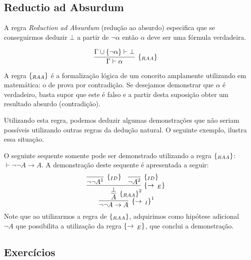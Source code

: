 \subsection{Reductio ad Absurdum}

A regra \emph{Reduction ad Absurdum} (redução ao absurdo) especifica
que se conseguirmos deduzir $\bot$ a partir de $\neg \alpha$ então $\alpha$ deve
ser uma fórmula verdadeira.

\[
    \infer[\raa]{\Gamma \vdash \alpha}
                     {\Gamma\cup\{\neg \alpha\}\vdash \bot}
\]

A regra $\scriptsize{\{_{RAA}\}}$ é a formalização lógica de um conceito amplamente
utilizando em matemática: o de prova por contradição. Se desejamos
demonstrar que $\alpha$ é verdadeiro, basta supor que este é falso e a
partir desta suposição obter um resultado absurdo (contradição).

Utilizando esta regra, podemos deduzir algumas demonstrações que não
seriam possíveis utilizando outras regras da dedução natural. O
seguinte exemplo, ilustra essa situação.

\begin{Example}
O seguinte sequente somente pode ser demonstrado utilizando a regra
$\scriptsize{\{_{RAA}\}}$: $\vdash \neg\neg A \to A$. A demonstração deste sequente é
apresentada a seguir:
\[
     \infer[\impI^1]{\neg\neg A \to A}
           {
             \infer[\raa^2]{A}
                      {
                        \infer[\impE]{\bot}
                                 {
                                   \infer[\Id]{\neg\neg A^1}{} &
                                   \infer[\Id]{\neg A^2}{}
                                 }
                      }
           }
\]
Note que ao utilizarmos a regra de $\scriptsize{\{_{RAA}\}}$, adquirimos como hipótese
adicional $\neg A$ que possibilita a utilização da regra $\scriptsize{\{\to\,_E\}}$, que
conclui a demonstração.
\end{Example}

\subsection{Exerc\'icios}

